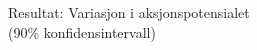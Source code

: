 \documentclass[presentation]{beamer}
\begin{document}

\begin{frame}{Resultat: Variasjon i aksjonspotensialet \\(90\% konfidensintervall)}
   \vspace{-5mm}
\begin{figure}
\end{figure}
\end{frame}
\end{document}
